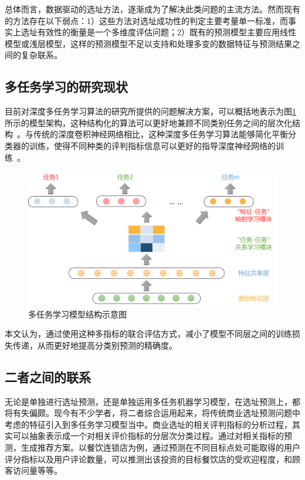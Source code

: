 \documentclass{llncs}
\begin{document}
总体而言，数据驱动的选址方法，逐渐成为了解决此类问题的主流方法。然而现有的方法存在以下弱点：1）这些方法对选址成功性的判定主要考量单一标准，而事实上选址有效性的衡量是一个多维度评估问题；2）既有的预测模型主要应用线性模型或浅层模型，这样的预测模型不足以支持和处理多变的数据特征与预测结果之间的复杂联系。

\subsection{多任务学习的研究现状}
目前对深度多任务学习算法的研究所提供的问题解决方案，可以概括地表示为图\ref{MTLmodel}所示的模型架构，这种结构化的算法可以更好地兼顾不同类别任务之间的层次化结构~\cite{ZhaoQiLu}。与传统的深度卷积神经网络相比，这种深度多任务学习算法能够简化平衡分类器的训练，使得不同种类的评判指标信息可以更好的指导深度神经网络的训练~\cite{DataClassify}。

\begin{figure}
	\centering
	\includegraphics[width=0.8\columnwidth]{figures/multiLearn.png}
	\caption{多任务学习模型结构示意图}
	\label{MTLmodel}
\end{figure}

本文认为，通过使用这种多指标的联合评估方式，减小了模型不同层之间的训练损失传递，从而更好地提高分类别预测的精确度。

\subsection{二者之间的联系}
无论是单独进行选址预测，还是单独运用多任务机器学习模型，在选址预测上，都将有失偏颇。现今有不少学者，将二者综合运用起来，将传统商业选址预测问题中考虑的特征引入到多任务学习模型当中。商业选址的相关评判指标的分析过程，其实可以抽象表示成一个对相关评价指标的分层次分类过程。通过对相关指标的预测，生成推荐方案。以餐饮连锁店为例，通过预测在不同目标点处可能取得的用户评分指标以及用户评论数量，可以推测出该投资的目标餐饮店的受欢迎程度，和顾客访问量等等。
\end{document}
